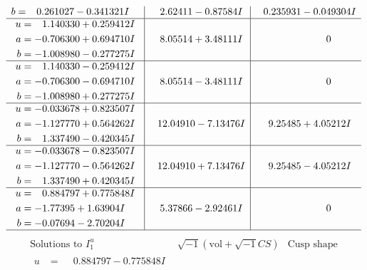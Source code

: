 \documentclass[1p]{elsarticle_modified}
\theoremstyle{definition}
\newcommand{\I}{\sqrt{-1}}
\begin{document}
$$\begin{array}{c|c|c}
\begin{aligned}
b &= \phantom{-}0.261027 - 0.341321 I\end{aligned}
 & \phantom{-}2.62411 - 0.87584 I & \phantom{-}0.235931 - 0.049304 I \\ \hline\begin{aligned}
u &= \phantom{-}1.140330 + 0.259412 I \\
a &= -0.706300 + 0.694710 I \\
b &= -1.008980 - 0.277275 I\end{aligned}
 & \phantom{-}8.05514 + 3.48111 I & \phantom{-0.000000 } 0 \\ \hline\begin{aligned}
u &= \phantom{-}1.140330 - 0.259412 I \\
a &= -0.706300 - 0.694710 I \\
b &= -1.008980 + 0.277275 I\end{aligned}
 & \phantom{-}8.05514 - 3.48111 I & \phantom{-0.000000 } 0 \\ \hline\begin{aligned}
u &= -0.033678 + 0.823507 I \\
a &= -1.127770 + 0.564262 I \\
b &= \phantom{-}1.337490 - 0.420345 I\end{aligned}
 & \phantom{-}12.04910 - 7.13476 I & \phantom{-}9.25485 + 4.05212 I \\ \hline\begin{aligned}
u &= -0.033678 - 0.823507 I \\
a &= -1.127770 - 0.564262 I \\
b &= \phantom{-}1.337490 + 0.420345 I\end{aligned}
 & \phantom{-}12.04910 + 7.13476 I & \phantom{-}9.25485 - 4.05212 I \\ \hline\begin{aligned}
u &= \phantom{-}0.884797 + 0.775848 I \\
a &= -1.77395 + 1.63904 I \\
b &= -0.07694 - 2.70204 I\end{aligned}
 & \phantom{-}5.37866 - 2.92461 I & \phantom{-0.000000 } 0\\
 \hline 
 \end{array}$$\newpage$$\begin{array}{c|c|c}  
\text{Solutions to }I^u_{1}& \I (\text{vol} + \sqrt{-1}CS) & \text{Cusp shape}\\
 \hline 
\begin{aligned}
u &= \phantom{-}0.884797 - 0.775848 I \\

\end{aligned}
\end{array}$$
\end{document}

